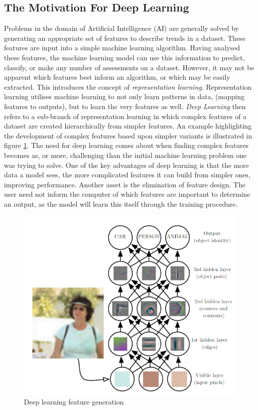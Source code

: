 \subsection{The Motivation For Deep Learning}
Problems in the domain of Artificial Intelligence (AI) are generally solved by generating an appropriate set of features to describe trends in a dataset. These features are input into a simple machine learning algorithm. Having analysed these features, the machine learning model can use this information to predict, classify, or make any number of assessments on a dataset. However, it may not be apparent which features best inform an algorithm, or which may be easily extracted. This introduces the concept of \textit{representation learning}. Representation learning utilises machine learning to not only learn patterns in data, (mapping features to outputs), but to learn the very features as well. \textit{Deep Learning} then refers to a sub-branch of representation learning in which complex features of a dataset are created hierarchically from simpler features. An example highlighting the development of complex features based upon simpler variants is illustrated in figure \ref{DL_feature_fig}. The need for deep learning comes about when finding complex features becomes as, or more, challenging than the initial machine learning problem one was trying to solve. One of the key advantages of deep learning is that the more data a model sees, the more complicated features it can build from simpler ones, improving performance. Another asset is the elimination of feature design. The user need not inform the computer of which features are important to determine an output, as the model will learn this itself through the training procedure.
\begin{figure}
        \centering
        \includegraphics[scale = 0.7]{images/DL_features_figure.png}
        \caption{Deep learning feature generation \cite{Goodfellow-et-al-2016}}
        \label{DL_feature_fig}
\end{figure}

